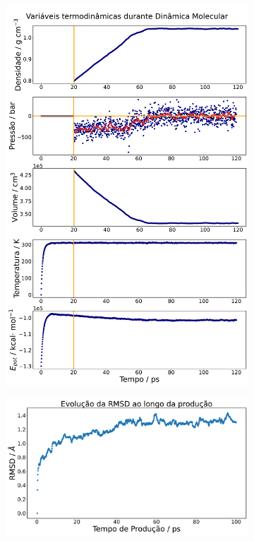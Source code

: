 \documentclass[12pt,a4paper]{article}
\begin{document}
	\begin{figure}[h]
	\centering
	\begin{subfigure}[b]{0.48\textwidth}
		\centering
		\includegraphics[width=\textwidth]{images/plots-summary.pdf}
		\caption{}
		\label{fig:an:plots-summary}
	\end{subfigure}
	\begin{subfigure}[b]{0.48\textwidth}
		\centering
		\includegraphics[width=\textwidth]{images/plots-rmsd.pdf}

\end{subfigure}
\end{figure}
\end{document}
